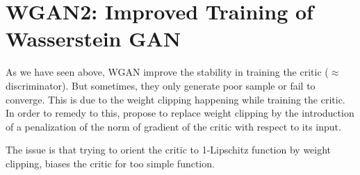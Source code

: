 \documentclass{article}
\begin{document}
\section{WGAN2: Improved Training of Wasserstein GAN}

As we have seen above, WGAN improve the stability in training the critic ($\approx$ discriminator). But sometimes, they only generate poor sample or fail to converge. This is due to the weight clipping happening while training the critic. In order to remedy to this, \cite{DBLP:journals/corr/GulrajaniAADC17} propose to replace weight clipping by the introduction of a penalization of the norm of gradient of the critic with respect to its input. 

The issue is that trying to orient the critic to 1-Lipschitz function by weight clipping, biases the critic for too simple function. 


%

 
\end{document}
